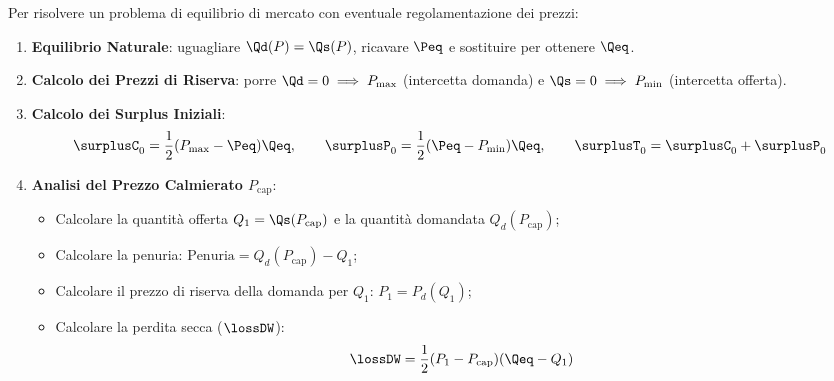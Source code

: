\begin{metodo}
Per risolvere un problema di equilibrio di mercato con eventuale regolamentazione dei prezzi:
\begin{enumerate}
    \item \textbf{Equilibrio Naturale}: uguagliare $\Qd(P) = \Qs(P)$, ricavare $\Peq$ e sostituire per ottenere $\Qeq$.
    \item \textbf{Calcolo dei Prezzi di Riserva}: porre $\Qd = 0 \implies P_{\max}$ (intercetta domanda) e $\Qs = 0 \implies P_{\min}$ (intercetta offerta).
    \item \textbf{Calcolo dei Surplus Iniziali}:
    \begin{equation}
        \surplusC_0 = \frac{1}{2} (P_{\max} - \Peq) \Qeq, \qquad \surplusP_0 = \frac{1}{2} (\Peq - P_{\min}) \Qeq, \qquad \surplusT_0 = \surplusC_0 + \surplusP_0
    \end{equation}
    \item \textbf{Analisi del Prezzo Calmierato $P_{\text{cap}}$}:
    \begin{itemize}
        \item Calcolare la quantità offerta $Q_1 = \Qs(P_{\text{cap}})$ e la quantità domandata $Q_d(P_{\text{cap}})$;
        \item Calcolare la penuria: $\text{Penuria} = Q_d(P_{\text{cap}}) - Q_1$;
        \item Calcolare il prezzo di riserva della domanda per $Q_1$: $P_1 = P_d(Q_1)$;
        \item Calcolare la perdita secca ($\lossDW$):
        \begin{equation}
            \lossDW = \frac{1}{2} (P_1 - P_{\text{cap}}) (\Qeq - Q_1)
        \end{equation}
    \end{itemize}
\end{enumerate}
\end{metodo}

